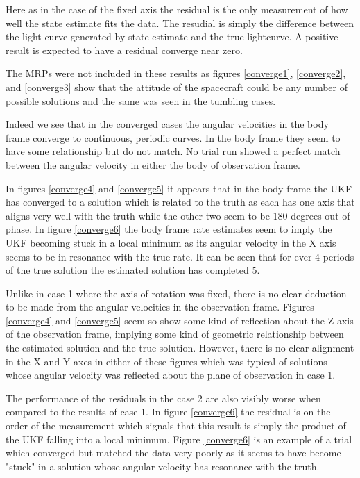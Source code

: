 Here as in the case of the fixed axis the residual is the only measurement of how well the state estimate fits the data. The resudial is simply the difference between the light curve generated by state estimate and the true lightcurve. A positive result is expected to have a residual converge near zero. 

The MRPs were not included in these results as figures \ref{converge1}, \ref{converge2}, and \ref{converge3} show that the attitude of the spacecraft could be any number of possible solutions and the same was seen in the tumbling cases.

Indeed we see that in the converged cases the angular velocities in the body frame converge to continuous, periodic curves. In the body frame they seem to have some relationship but do not match. No trial run showed a perfect match between the angular velocity in either the body of observation frame.

In figures \ref{converge4} and \ref{converge5} it appears that in the body frame the UKF has converged to a solution which is related to the truth as each has one axis that aligns very well with the truth while the other two seem to be 180 degrees out of phase. In figure \ref{converge6} the body frame rate estimates seem to imply the UKF becoming stuck in a local minimum as its angular velocity in the X axis seems to be in resonance with the true rate. It can be seen that for ever 4 periods of the true solution the estimated solution has completed 5.

Unlike in case 1 where the axis of rotation was fixed, there is no clear deduction to be made from the angular velocities in the observation frame. Figures \ref{converge4} and \ref{converge5} seem so show some kind of reflection about the Z axis of the observation frame, implying some kind of geometric relationship between the estimated solution and the true solution. However, there is no clear alignment in the X and Y axes in either of these figures which was typical of solutions whose angular velocity was reflected about the plane of observation in case 1.

The performance of the residuals in the case 2 are also visibly worse when compared to the results of case 1. In figure \ref{converge6} the residual is on the order of the measurement which signals that this result is simply the product of the UKF falling into a local minimum. Figure \ref{converge6} is an example of a trial which converged but matched the data very poorly as it seems to have become "stuck" in a solution whose angular velocity has resonance with the truth.

